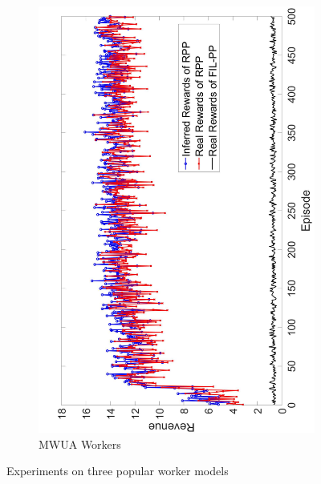 \documentclass[letterpaper]{article} %
\begin{document}
\begin{figure}[htb]
\begin{subfigure}[t]{0.3\textwidth}
        \includegraphics[width=\textwidth]{image/3}
        \caption{\label{E3}  MWUA Workers}
    \end{subfigure}    
    \caption{\label{ED}Experiments on three popular worker models}
\end{figure}
\end{document}
